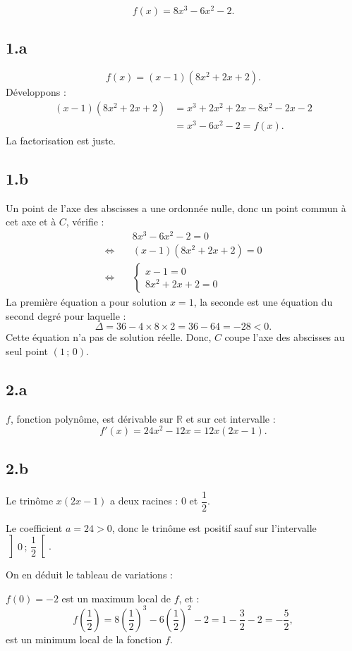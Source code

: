 \[
	f(x) = 8x^3 - 6x^2 - 2.
	\]
	
	\subsection*{1.a}
	\[
	f(x) = (x - 1)\left(8x^2 + 2x + 2\right).
	\]
	Développons :
	\begin{align*}
		(x - 1)\left(8x^2 + 2x + 2\right) &= x^3 + 2x^2 + 2x - 8x^2 - 2x - 2 \\
		&= x^3 - 6x^2 - 2 = f(x).
	\end{align*}
	La factorisation est juste.
	
	\subsection*{1.b}
	Un point de l'axe des abscisses a une ordonnée nulle, donc un point commun à cet axe et à \(C\), vérifie :
	\begin{align*}
		&8x^3 - 6x^2 - 2 = 0 \\
		\iff \quad & (x - 1)\left(8x^2 + 2x + 2\right) = 0 \\
		\iff \quad & 
		\begin{cases}
			x - 1 = 0 \\
			8x^2 + 2x + 2 = 0
		\end{cases}
	\end{align*}
	La première équation a pour solution \(x = 1\), la seconde est une équation du second degré pour laquelle :
	\[
	\Delta = 36 - 4 \times 8 \times 2 = 36 - 64 = -28 < 0.
	\]
	Cette équation n'a pas de solution réelle.
	Donc, \(C\) coupe l'axe des abscisses au seul point \((1\,;\,0)\).
	
	\subsection*{2.a}
	\(f\), fonction polynôme, est dérivable sur \(\mathbb{R}\) et sur cet intervalle :
	\[
	f'(x) = 24x^2 - 12x = 12x(2x - 1).
	\]
	
	\subsection*{2.b}
	Le trinôme \(x(2x - 1)\) a deux racines : \(0\) et \(\dfrac{1}{2}\).
	
	Le coefficient \(a = 24 > 0\), donc le trinôme est positif sauf sur l'intervalle \(\left]0\,;\,\dfrac{1}{2}\right[\).
	
	On en déduit le tableau de variations :
	\begin{center}
\end{center}
		\(f(0) = -2\) est un maximum local de \(f\), et :
		\[
		f\left(\dfrac{1}{2}\right) = 8\left(\dfrac{1}{2}\right)^3 - 6\left(\dfrac{1}{2}\right)^2 - 2 = 1 - \dfrac{3}{2} - 2 = -\dfrac{5}{2},
		\]
		est un minimum local de la fonction \(f\).

